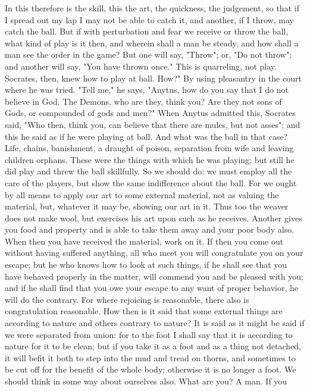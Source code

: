 \documentclass[a4paper]{article}
\begin{document}
In this therefore is the skill, this the art, the quickness, the judgement, so
that if I spread out my lap I may not be able to catch it, and another, if I
throw, may catch the ball. But if with perturbation and fear we receive or
throw the ball, what kind of play is it then, and wherein shall a man be
steady, and how shall a man see the order in the game? But one will say,
"Throw"; or, "Do not throw"; and another will say, "You have thrown once." This
is quarreling, not play.
    Socrates, then, knew how to play at ball. How?" By using pleasantry in the
court where he was tried. "Tell me," he says, "Anytus, how do you say that I do
not believe in God. The Demons, who are they, think you? Are they not sons of
Gods, or compounded of gods and men?" When Anytus admitted this, Socrates said,
"Who then, think you, can believe that there are mules, but not asses"; and
this he said as if he were playing at ball. And what was the ball in that case?
Life, chains, banishment, a draught of poison, separation from wife and leaving
children orphans. These were the things with which he was playing; but still he
did play and threw the ball skillfully. So we should do: we must employ all the
care of the players, but show the same indifference about the ball. For we
ought by all means to apply our art to some external material, not as valuing
the material, but, whatever it may be, showing our art in it. Thus too the
weaver does not make wool, but exercises his art upon such as he receives.
Another gives you food and property and is able to take them away and your poor
body also. When then you have received the material, work on it. If then you
come out without having suffered anything, all who meet you will congratulate
you on your escape; but he who knows how to look at such things, if he shall
see that you have behaved properly in the matter, will commend you and be
pleased with you; and if he shall find that you owe your escape to any want of
proper behavior, he will do the contrary. For where rejoicing is reasonable,
there also is congratulation reasonable.
    How then is it said that some external things are according to nature and
others contrary to nature? It is said as it might be said if we were separated
from union: for to the foot I shall say that it is according to nature for it
to be clean; but if you take it as a foot and as a thing not detached, it will
befit it both to step into the mud and tread on thorns, and sometimes to be cut
off for the benefit of the whole body; otherwise it is no longer a foot. We
should think in some way about ourselves also. What are you? A man. If you
\end{document}

